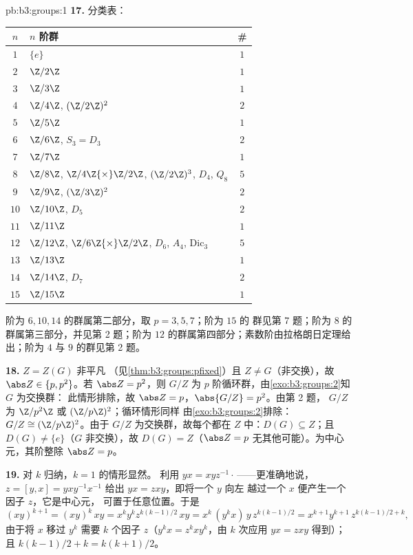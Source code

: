 \begin{solution}{pb:b3:groups:1}
\textbf{17.} 分类表：
\begin{center}
\begin{tabular}{c l c}
$n$ & $n$ 阶群 & \#\\
\hline
$1$ & $\{e\}$ & $1$\\
$2$ & $\Z/2\Z$ & $1$\\
$3$ & $\Z/3\Z$ & $1$\\
$4$ & $\Z/4\Z$, $(\Z/2\Z)^2$ & $2$\\
$5$ & $\Z/5\Z$ & $1$\\
$6$ & $\Z/6\Z$, $S_3 = D_3$ & $2$\\
$7$ & $\Z/7\Z$ & $1$\\
$8$ & $\Z/8\Z$, $\Z/4\Z{\times}\Z/2\Z$, $(\Z/2\Z)^3$, $D_4$,
      $Q_8$ & $5$\\
$9$ & $\Z/9\Z$, $(\Z/3\Z)^2$ & $2$\\
$10$ & $\Z/10\Z$, $D_5$ & $2$\\
$11$ & $\Z/11\Z$ & $1$\\
$12$ & $\Z/12\Z$, $\Z/6\Z{\times}\Z/2\Z$, $D_6$, $A_4$,
       $\mathrm{Dic}_3$ & $5$\\
$13$ & $\Z/13\Z$ & $1$\\
$14$ & $\Z/14\Z$, $D_7$ & $2$\\
$15$ & $\Z/15\Z$ & $1$\\
\end{tabular}
\end{center}
阶为 $6, 10, 14$ 的群属第二部分，取 $p = 3, 5, 7$；阶为 $15$ 的
群见第 7 题；阶为 $8$ 的群属第三部分，并见第 2 题；阶为
$12$ 的群属第四部分；素数阶由拉格朗日定理给出；阶为 $4$ 与
$9$ 的群见第 2 题。

\textbf{18.} $Z = Z(G)$ 非平凡
（见\cref{thm:b3:groups:pfixed}）且 $Z \neq G$（非交换），故
$\abs Z \in \{p, p^2\}$。若 $\abs Z = p^2$，则 $G/Z$ 为
$p$ 阶循环群，由\cref{exo:b3:groups:2}知 $G$ 为交换群：
此情形排除，故 $\abs Z = p$，$\abs{G/Z} = p^2$。由第 2 题，
$G/Z$ 为 $\Z/p^2\Z$ 或 $(\Z/p\Z)^2$；循环情形同样
由\cref{exo:b3:groups:2}排除：$G/Z \cong (\Z/p\Z)^2$。由于 $G/Z$
为交换群，故每个都在 $Z$ 中：$D(G) \subseteq Z$；且
$D(G) \neq \{e\}$（$G$ 非交换），故 $D(G) = Z$（$\abs Z = p$
无其他可能）。为中心元，其阶整除
$\abs Z = p$。

\textbf{19.} 对 $k$ 归纳，$k = 1$ 的情形显然。
利用 $yx = xyz^{-1}\cdot$\,——更准确地说，$z = [y, x] =
yxy^{-1}x^{-1}$ 给出 $yx = zxy$，即将一个 $y$ 向左
越过一个 $x$ 便产生一个因子 $z$，它是中心元，
可置于任意位置。于是
\[
(xy)^{k+1} = (xy)^k\,xy = x^ky^kz^{k(k-1)/2}\,xy
= x^k\,(y^kx)\,y\,z^{k(k-1)/2}
= x^{k+1}y^{k+1}\,z^{k(k-1)/2 + k},
\]
由于将 $x$ 移过 $y^k$ 需要 $k$ 个因子 $z$（$y^kx =
z^kxy^k$，由 $k$ 次应用 $yx = zxy$ 得到）；且 $k(k-1)/2 + k
= k(k+1)/2$。


\end{solution}

